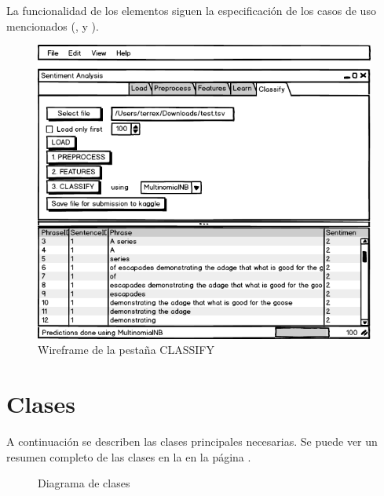 La funcionalidad de los elementos siguen la especificación de los casos de uso mencionados (,  y ).

\begin{figure}[htbp]
\centering
\includegraphics[width=12cm,clip=true,trim=0 0 0 38pt]{gui-5-classify}
\caption{Wireframe de la pestaña CLASSIFY}
\label{fig:gui-5-classify}
\end{figure}


\section{Clases}

A continuación se describen las clases principales necesarias. Se puede ver un resumen completo de las clases en la  en la página \pageref{fig:classes}.

\begin{landscape}
\begin{figure}[htbp]
\centering
\resizebox{!}{0.99\textwidth}{}
\caption{Diagrama de clases}
\label{fig:classes}
\end{figure}
\end{landscape}

\subsection{}

\subsection{}

\subsection{}

